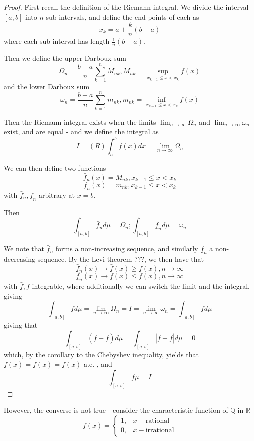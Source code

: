 \documentclass[11pt,a4paper]{report}
\theoremstyle{plain}
\theoremstyle{definition}
\theoremstyle{remark}
\newcommand{\R}{\mathbb{R}}
\newcommand{\Q}{\mathbb{Q}}
\newcommand{\abs}[1]{\left| #1 \right|}
\begin{document}
\begin{proof}
    First recall the definition of the Riemann integral. We divide the interval $[a, b]$ into $n$ sub-intervals, and define the end-points of each as
    $$ x_k = a + \frac{k}{n}(b - a) $$
    where each sub-interval has length $\frac{1}{n}(b -a)$.

    Then we define the upper Darboux sum
    $$\Omega_n = \frac{b-a}{n} \sum_{k=1}^n M_{nk}, M_{nk} = \sup_{x_{k-1} \le x < x_k} f(x) $$
    and the lower Darboux sum
    $$\omega_n = \frac{b-a}{n} \sum_{k=1}^n m_{nk}, m_{nk} = \inf_{x_{k-1} \le x < x_k} f(x) $$

    Then the Riemann integral exists when the limits $\lim_{n \rightarrow \infty} \Omega_n$ and $\lim_{n \rightarrow \infty} \omega_n$ exist, and are equal - and we define the integral as
    $$ I = (R) \int_a^b f(x) dx = \lim_{n \rightarrow \infty} \Omega_n $$

    \newcommand{\highF}{\bar{f}}
    \newcommand{\lowF}{\underline{f}}

    We can then define two functions
    $$ \highF_n(x) = M_{nk}, x_{k-1} \le x < x_k $$
    $$ \lowF_n(x) = m_{nk}, x_{k-1} \le x < x_k $$
    with $\highF_n, \lowF_n$ arbitrary at $x = b$.

    Then
    $$ \int_{[a, b]} \highF_n d\mu = \Omega_n; \int_{[a, b]} \lowF_n d\mu = \omega_n $$

    We note that $\highF_n$ forms a non-increasing sequence, and similarly $\lowF_n$ a non-decreasing sequence. By the Levi theorem ???, we then have that
    $$ \highF_n(x) \rightarrow \highF(x) \ge f(x), n \rightarrow \infty $$
    $$ \lowF_n(x) \rightarrow \lowF(x) \le f(x), n \rightarrow \infty $$
    with $\highF, \lowF$ integrable, where additionally we can switch the limit and the integral, giving
    $$ \int_{[a, b]} \highF d\mu = \lim_{n \rightarrow \infty} \Omega_n = I = \lim_{n \rightarrow \infty} \omega_n = \int_{[a, b]} \lowF d \mu $$
    giving that 
    $$ \int_{[a, b]} (\highF - \lowF) d\mu = \int_{[a, b]} \abs{\highF - \lowF} d\mu = 0 $$
    which, by the corollary to the Chebyshev inequality, yields that $\highF(x) = f(x) = \lowF(x)$ a.e. , and
    $$ \int_{[a, b]} f \mu = I $$
\end{proof}

However, the converse is not true - consider the characteristic function of $\Q$ in $\R$
$$ f(x) = \begin{cases}
    1, &x - \text{rational} \\
    0, &x - \text{irrational} 
\end{cases}$$
\end{document}
